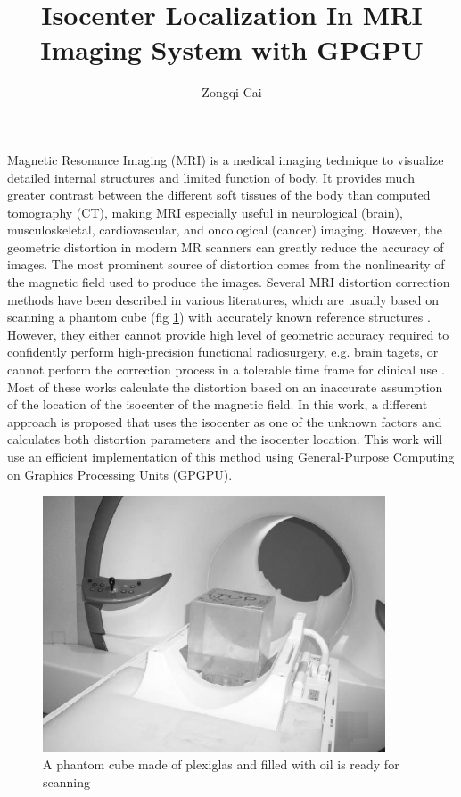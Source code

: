 \documentclass{sbthesis}
\title{Isocenter Localization In MRI Imaging System with GPGPU}
\author{Zongqi Cai}
\begin{document}
\ThesisProposal

\label{Introduction}

\indent

Magnetic Resonance Imaging (MRI) is a medical imaging technique to visualize detailed
internal structures and limited function of body. It provides much greater contrast
between the different soft tissues of the body than computed tomography (CT), making
MRI especially useful in neurological (brain), musculoskeletal, cardiovascular, and
oncological (cancer) imaging. However, the geometric distortion in modern MR scanners can
greatly reduce the accuracy of images. The most prominent source of distortion
comes from the nonlinearity of the magnetic field used to produce the images.
Several MRI distortion correction methods have been described in various literatures,
which are usually based on scanning a phantom cube (fig \ref{fig:1}) with accurately known reference structures \cite{R3, R4, R5, R6}. However, they either cannot provide high level of geometric
accuracy required to confidently perform high-precision functional radiosurgery, e.g. brain
tagets, or cannot perform the correction process in a tolerable time frame for clinical use \cite{tom}.
Most of these works calculate the distortion based on an inaccurate assumption of the location of the isocenter
of the magnetic field.
In this work, a different approach is proposed that uses the isocenter as one of the unknown factors and calculates
both distortion parameters and the isocenter location.  %
This work will use an efficient implementation of this
method using General-Purpose Computing on Graphics Processing Units (GPGPU).

\begin{figure}[htb]
  \begin{minipage}{0.80\linewidth}
    \centering
    \centerline{\mbox{\includegraphics[width=4in]{images/phantom_scanner2.eps}}}
    \centerline{}\medskip
  \end{minipage}
  \caption{A phantom cube made of plexiglas and filled with oil is ready for scanning} \label{fig:1}
\end{figure} 
\end{document}
